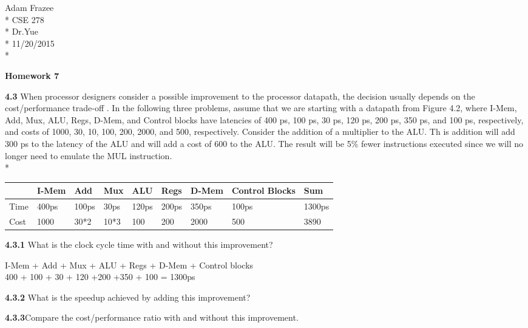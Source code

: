 \documentclass{article}
\begin{document}
	\begin{flushleft}
		Adam Frazee \\*
		CSE 278\\*
		Dr.Yue\\*
		11/20/2015\\*
	\end{flushleft}
	\begin{center}
		\LARGE{\textbf{Homework 7}}
	\end{center}
	\textbf{4.3} When processor designers consider a possible improvement to the processor
datapath, the decision usually depends on the cost/performance trade-off . In
the following three problems, assume that we are starting with a datapath from
Figure 4.2, where I-Mem, Add, Mux, ALU, Regs, D-Mem, and Control blocks have
latencies of 400 ps, 100 ps, 30 ps, 120 ps, 200 ps, 350 ps, and 100 ps, respectively,
and costs of 1000, 30, 10, 100, 200, 2000, and 500, respectively.
Consider the addition of a multiplier to the ALU. Th is addition will add 300 ps to the
latency of the ALU and will add a cost of 600 to the ALU. The result will be 5\% fewer
instructions executed since we will no longer need to emulate the MUL instruction.
\\*
\begin{center}
  \begin{tabular}{ |l | l | l | l | l | l | l  | l || l | }
    \hline
    &I-Mem & Add & Mux & ALU & Regs & D-Mem & Control Blocks & Sum \\ \hline
    Time&400ps & 100ps & 30ps & 120ps & 200ps &350ps & 100ps& 1300ps\\ \hline
    Cost&1000 & 30*2 & 10*3 & 100 & 200 & 2000 & 500 & 3890 \\
    \hline
  \end{tabular}
\end{center}

\textbf{4.3.1} What is the clock cycle time with and without this improvement?
\begin{center}



I-Mem + Add + Mux + ALU + Regs + D-Mem + Control blocks \\
400 + 100 + 30 + 120 +200 +350 + 100 = 1300ps

\end{center}

\textbf{4.3.2} What is the speedup achieved by adding this improvement?

\textbf{4.3.3}Compare the cost/performance ratio with and without this
improvement.
\end{document}

